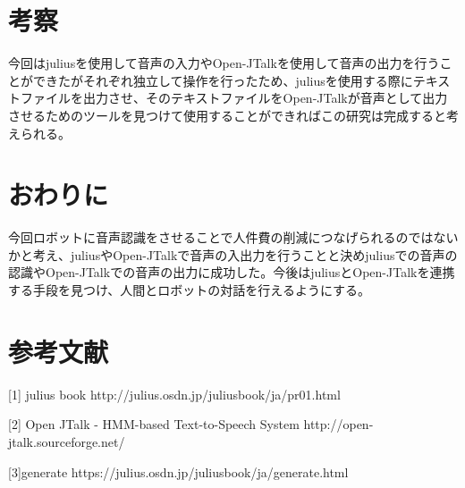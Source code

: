 \documentclass[11pt]{jsarticle}
\begin{document}
\section{考察}
今回はjuliusを使用して音声の入力やOpen-JTalkを使用して音声の出力を行うことができたがそれぞれ独立して操作を行ったため、juliusを使用する際にテキストファイルを出力させ、そのテキストファイルをOpen-JTalkが音声として出力させるためのツールを見つけて使用することができればこの研究は完成すると考えられる。


\section{おわりに}
今回ロボットに音声認識をさせることで人件費の削減につなげられるのではないかと考え、juliusやOpen-JTalkで音声の入出力を行うことと決めjuliusでの音声の認識やOpen-JTalkでの音声の出力に成功した。今後はjuliusとOpen-JTalkを連携する手段を見つけ、人間とロボットの対話を行えるようにする。

\section{参考文献}
[1] julius book http://julius.osdn.jp/juliusbook/ja/pr01.html


[2] Open JTalk - HMM-based Text-to-Speech System http://open-jtalk.sourceforge.net/


[3]generate https://julius.osdn.jp/juliusbook/ja/generate.html
\end{document}
